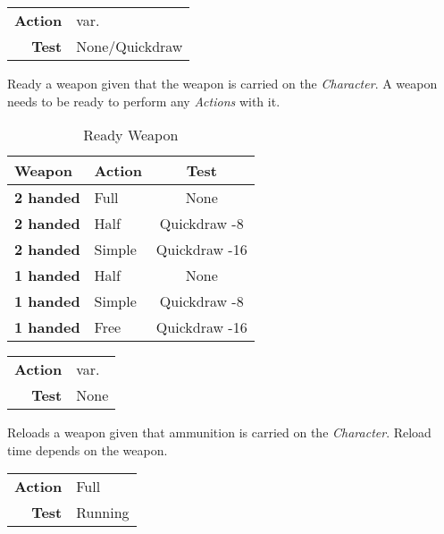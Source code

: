 \begin{tabular}{rl}
    \textbf{Action} & var.           \\
    \textbf{Test}   & None/Quickdraw \\
\end{tabular}

\hfill

Ready a weapon given that the weapon is carried on the \emph{Character}.
A weapon needs to be ready to perform any \emph{Actions} with it.

\begin{table}[htb]
    \caption[Ready Weapon]{Ready Weapon}\label{tab:ready weapon}
    \centering
    \begin{tabular}{llc}
        \toprule
        \textbf{Weapon}   & \textbf{Action} & \textbf{Test} \\
        \midrule
        \textbf{2 handed} & Full            & None          \\
        \textbf{2 handed} & Half            & Quickdraw -8  \\
        \textbf{2 handed} & Simple          & Quickdraw -16 \\
        \textbf{1 handed} & Half            & None          \\
        \textbf{1 handed} & Simple          & Quickdraw -8  \\
        \textbf{1 handed} & Free            & Quickdraw -16 \\
        \bottomrule
    \end{tabular}
\end{table}


\begin{tabular}{rl}
    \textbf{Action} & var. \\
    \textbf{Test}   & None \\
\end{tabular}

\hfill

Reloads a weapon given that ammunition is carried on the \emph{Character}.
Reload time depends on the weapon.

\begin{tabular}{rl}
    \textbf{Action} & Full    \\
    \textbf{Test}   & Running \\
\end{tabular}

